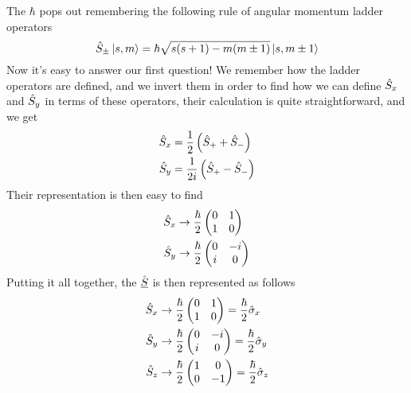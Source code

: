 \documentclass[../qm.tex]{subfiles}
\begin{document}
	The $\hbar$ pops out remembering the following rule of angular momentum ladder operators
	\begin{equation}
		\hat{S}_{\pm}\ket{s,m}=\hbar\sqrt{s(s+1)-m(m\pm1)}\ket{s,m\pm1}
		\label{eq:spinladopr}
	\end{equation}
	Now it's easy to answer our first question! We remember how the ladder operators are defined, and we invert them in order to find how we can define $\hat{S}_x$ and $\hat{S}_y$ in terms of these operators, their calculation is quite straightforward, and we get
	\begin{equation}
		\begin{aligned}
			\hat{S}_x&=\frac{1}{2}\left( \hat{S}_{+}+\hat{S}_{-} \right)\\
			\hat{S}_y&=\frac{1}{2i}\left( \hat{S}_{+}-\hat{S}_{-} \right)
		\end{aligned}
		\label{eq:sxsyspsmrep}
	\end{equation}
	Their representation is then easy to find
	\begin{equation}
		\begin{aligned}
			\hat{S}_x&\to\frac{\hbar}{2}\begin{pmatrix}
				0&1\\
				1&0
			\end{pmatrix}\\
			\hat{S}_y&\to\frac{\hbar}{2}\begin{pmatrix}
				0&-i\\
				i&0
			\end{pmatrix}
		\end{aligned}
		\label{eq:sxsyrep}
	\end{equation}
	Putting it all together, the $\hat{\underline{S}}$ is then represented as follows
	\begin{equation}
		\begin{aligned}
			\hat{S}_x&\to\frac{\hbar}{2}\begin{pmatrix}
				0&1\\
				1&0
			\end{pmatrix}=\frac{\hbar}{2}\hat{\sigma}_x\\
			\hat{S}_y&\to\frac{\hbar}{2}\begin{pmatrix}
				0&-i\\
				i&0
			\end{pmatrix}=\frac{\hbar}{2}\hat{\sigma}_y\\
			\hat{S}_z&\to\frac{\hbar}{2}\begin{pmatrix}
				1&0\\
				0&-1
			\end{pmatrix}=\frac{\hbar}{2}\hat{\sigma}_z
		\end{aligned}
		\label{eq:paulimatrices}
	\end{equation}
\end{document}

